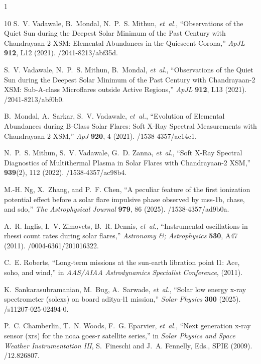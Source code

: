 \documentclass[12pt]{spieman}  %
\newcommand{\apj}{ApJ}
\newcommand{\apjl}{ApJL}
\begin{document}
\begin{spacing}{1}
\begin{thebibliography}{10}
S.~V. {Vadawale}, B.~{Mondal}, N.~P.~S. {Mithun}, {\em et~al.}, ``{Observations of the Quiet Sun during the Deepest Solar Minimum of the Past Century with Chandrayaan-2 XSM: Elemental Abundances in the Quiescent Corona},'' {\em \apjl} {\bf 912}, L12  (2021).
/2041-8213/abf35d.

S.~V. {Vadawale}, N.~P.~S. {Mithun}, B.~{Mondal}, {\em et~al.}, ``{Observations of the Quiet Sun during the Deepest Solar Minimum of the Past Century with Chandrayaan-2 XSM: Sub-A-class Microflares outside Active Regions},'' {\em \apjl} {\bf 912}, L13  (2021).
/2041-8213/abf0b0.

B.~{Mondal}, A.~{Sarkar}, S.~V. {Vadawale}, {\em et~al.}, ``{Evolution of Elemental Abundances during B-Class Solar Flares: Soft X-Ray Spectral Measurements with Chandrayaan-2 XSM},'' {\em \apj} {\bf 920}, 4  (2021).
/1538-4357/ac14c1.

N.~P.~S. Mithun, S.~V. Vadawale, G.~D. Zanna, {\em et~al.}, ``Soft {{X-Ray Spectral Diagnostics}} of {{Multithermal Plasma}} in {{Solar Flares}} with {{Chandrayaan-2 XSM}},''  {\bf 939}(2), 112  (2022).
/1538-4357/ac98b4.

M.-H. Ng, X.~Zhang, and P.~F. Chen, ``A peculiar feature of the first ionization potential effect before a solar flare impulsive phase observed by mss-1b, chase, and sdo,'' {\em The Astrophysical Journal} {\bf 979}, 86  (2025).
/1538-4357/ad9b0a.

A.~R. Inglis, I.~V. Zimovets, B.~R. Dennis, {\em et~al.}, ``Instrumental oscillations in rhessi count rates during solar flares,'' {\em Astronomy \&; Astrophysics} {\bf 530}, A47  (2011).
/0004-6361/201016322.

C.~E. Roberts, ``Long-term missions at the sun-earth libration point l1: Ace, soho, and wind,'' in {\em AAS/AIAA Astrodynamics Specialist Conference},   (2011).

K.~Sankarasubramanian, M.~Bug, A.~Sarwade, {\em et~al.}, ``Solar low energy x-ray spectrometer (solexs) on board aditya-l1 mission,'' {\em Solar Physics} {\bf 300}  (2025).
/s11207-025-02494-0.

P.~C. Chamberlin, T.~N. Woods, F.~G. Eparvier, {\em et~al.}, ``Next generation x-ray sensor (xrs) for the noaa goes-r satellite series,'' in {\em Solar Physics and Space Weather Instrumentation III},  S.~Fineschi and J.~A. Fennelly, Eds., SPIE  (2009).
/12.826807.


\end{thebibliography}
\end{spacing}
\end{document}
